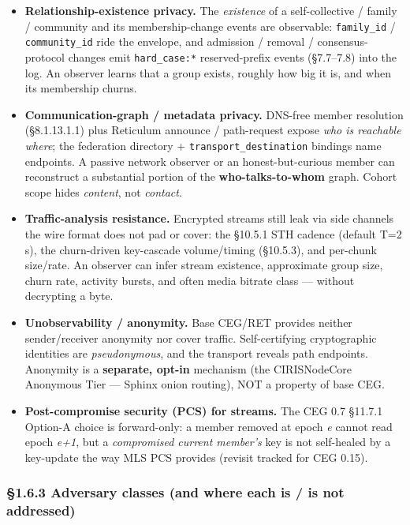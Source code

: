 \documentclass[10pt]{article}
\begin{document}
\begin{itemize}\setlength\itemsep{0pt}
\item \textbf{Relationship-existence privacy.} The \textit{existence} of a self-collective / family / community and its membership-change events are observable: \texttt{family\_id} / \texttt{community\_id} ride the envelope, and admission / removal / consensus-protocol changes emit \texttt{hard\_case:*} reserved-prefix events (§7.7–7.8) into the log. An observer learns that a group exists, roughly how big it is, and when its membership churns.
\item \textbf{Communication-graph / metadata privacy.} DNS-free member resolution (§8.1.13.1.1) plus Reticulum announce / path-request expose \textit{who is reachable where}; the federation directory + \texttt{transport\_destination} bindings name endpoints. A passive network observer or an honest-but-curious member can reconstruct a substantial portion of the \textbf{who-talks-to-whom} graph. Cohort scope hides \textit{content}, not \textit{contact}.
\item \textbf{Traffic-analysis resistance.} Encrypted streams still leak via side channels the wire format does not pad or cover: the §10.5.1 STH cadence (default T=2 s), the churn-driven key-cascade volume/timing (§10.5.3), and per-chunk size/rate. An observer can infer stream existence, approximate group size, churn rate, activity bursts, and often media bitrate class — without decrypting a byte.
\item \textbf{Unobservability / anonymity.} Base CEG/RET provides neither sender/receiver anonymity nor cover traffic. Self-certifying cryptographic identities are \textit{pseudonymous}, and the transport reveals path endpoints. Anonymity is a \textbf{separate, opt-in} mechanism (the CIRISNodeCore Anonymous Tier — Sphinx onion routing), NOT a property of base CEG.
\item \textbf{Post-compromise security (PCS) for streams.} The CEG 0.7 §11.7.1 Option-A choice is forward-only: a member removed at epoch \textit{e} cannot read epoch \textit{e+1}, but a \textit{compromised current member's} key is not self-healed by a key-update the way MLS PCS provides (revisit tracked for CEG 0.15).
\end{itemize}


\subsubsection*{§1.6.3 Adversary classes (and where each is / is not addressed)}
\end{document}

